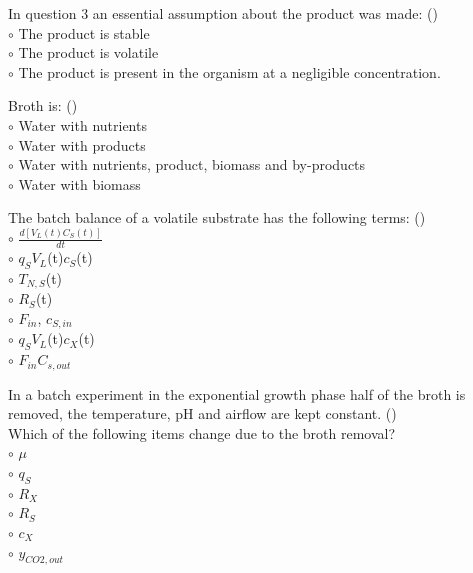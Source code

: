 \documentclass[]{beamer}
\begin{document}
\begin{frame}[shrink] {}
\addtocounter{questions}{1}
\color{blue}
In question 3 an essential assumption about the product was made: ()\\
\color{black}
\setlength{\parindent}{-0.4cm}
{\color{red}$\circ$}  The product is stable \\
{\color{red}$\circ$} The product is volatile \\
{\color{red}$\circ$} The product is present in the organism at a negligible concentration.  \\
\end{frame}

\begin{frame}[shrink] {}
\addtocounter{questions}{1}
\color{blue}
Broth is: ()\\
\color{black}
\setlength{\parindent}{-0.4cm}
{\color{red}$\circ$}  Water with nutrients \\
{\color{red}$\circ$} Water with products \\
{\color{red}$\circ$}  Water with nutrients, product, biomass and by-products \\
{\color{red}$\circ$} Water with biomass  \\
\end{frame}

\begin{frame}[shrink] {} 
\color{blue}
    
The batch balance of a volatile substrate has the following terms: ({\color{green}{Q6}})\\[0.5em]
\color{black}
\setlength{\parindent}{-0.4cm}
{\color{red}$\circ$} $\frac{d[V_L(t)C_S(t)]}{dt}$  \\
{\color{red}$\circ$} $q_{S}$$V_{L}$(t)$c_{S}$(t)  \\
{\color{red}$\circ$} $T_{N,S}$(t)  \\
{\color{red}$\circ$} $R_{S}$(t)  \\
{\color{red}$\circ$} $F_{in}$, $c_{S,in}$  \\
{\color{red}$\circ$} $q_{S}$$V_{L}$(t)$c_{X}$(t)  \\
{\color{red}$\circ$} $F_{in}$$C_{s,out}$  \\
\end{frame}


\begin{frame}[shrink] {} 
\color{blue}
  In a batch experiment in the exponential growth phase half of the broth is removed, the temperature, pH and airflow are kept constant.
 ({\color{green}{Q7}})\\
  Which of the following items change due to the broth removal?
  \\
\color{black}
\setlength{\parindent}{-0.4cm}
{\color{red}$\circ$} $\mu$  \\
{\color{red}$\circ$} $q_{S}$  \\
{\color{red}$\circ$} $R_{X}$  \\
{\color{red}$\circ$} $R_{S}$  \\
{\color{red}$\circ$} $c_{X}$  \\
{\color{red}$\circ$} $y_{CO2,out}$  \\
\end{frame}
\end{document}
